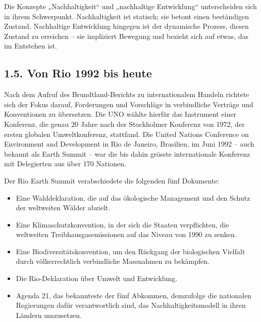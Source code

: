 \documentclass[
  letterpaper,
  DIV=11,
  numbers=noendperiod]{scrartcl}
\providecommand{\tightlist}{%
  \setlength{\itemsep}{0pt}\setlength{\parskip}{0pt}}\usepackage{longtable,booktabs,array}
\begin{document}
\begin{tcolorbox}[enhanced jigsaw, opacitybacktitle=0.6, breakable, left=2mm, colback=white, leftrule=.75mm, colbacktitle=quarto-callout-note-color!10!white, bottomrule=.15mm, toprule=.15mm, titlerule=0mm, title=\textcolor{quarto-callout-note-color}{\faInfo}\hspace{0.5em}{Nachhaltigkeit und nachhaltige Entwicklung}, colframe=quarto-callout-note-color-frame, bottomtitle=1mm, opacityback=0, arc=.35mm, toptitle=1mm, rightrule=.15mm, coltitle=black]

Die Konzepte „Nachhaltigkeit`` und „nachhaltige Entwicklung``
unterscheiden sich in ihrem Schwerpunkt. Nachhaltigkeit ist statisch;
sie betont einen beständigen Zustand. Nachhaltige Entwicklung hingegen
ist der dynamische Prozess, diesen Zustand zu erreichen -- sie
impliziert Bewegung und bezieht sich auf etwas, das im Entstehen ist.

\end{tcolorbox}

\subsection{1.5. Von Rio 1992 bis heute}\label{von-rio-1992-bis-heute}

Nach dem Aufruf des Brundtland-Berichts zu internationalem Handeln
richtete sich der Fokus darauf, Forderungen und Vorschläge in
verbindliche Verträge und Konventionen zu übersetzen. Die UNO wählte
hierfür das Instrument einer Konferenz, die genau 20 Jahre nach der
Stockholmer Konferenz von 1972, der ersten globalen Umweltkonferenz,
stattfand. Die United Nations Conference on Environment and Development
in Rio de Janeiro, Brasilien, im Juni 1992 -- auch bekannt als Earth
Summit -- war die bis dahin grösste internationale Konferenz mit
Delegierten aus über 170 Nationen.

Der Rio Earth Summit verabschiedete die folgenden fünf Dokumente:

\begin{itemize}
\tightlist
\item
  Eine Walddeklaration, die auf das ökologische Management und den
  Schutz der weltweiten Wälder abzielt.\\
\item
  Eine Klimaschutzkonvention, in der sich die Staaten verpflichten, die
  weltweiten Treibhausgasemissionen auf das Niveau von 1990 zu senken.\\
\item
  Eine Biodiversitätskonvention, um den Rückgang der biologischen
  Vielfalt durch völkerrechtlich verbindliche Massnahmen zu bekämpfen.\\
\item
  Die Rio-Deklaration über Umwelt und Entwicklung.\\
\item
  Agenda 21, das bekannteste der fünf Abkommen, demzufolge die
  nationalen Regierungen dafür verantwortlich sind, das
  Nachhaltigkeitsmodell in ihren Ländern umzusetzen.
\end{itemize}
\end{document}
